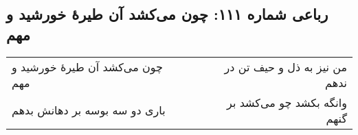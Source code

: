 \begin{center}
\section*{رباعی شماره ۱۱۱: چون می‌کشد آن طیرهٔ خورشید و مهم}
\label{sec:111}
\begin{longtable}{l p{0.5cm} r}
چون می‌کشد آن طیرهٔ خورشید و مهم
&&
من نیز به ذل و حیف تن در ندهم
\\
باری دو سه بوسه بر دهانش بدهم
&&
وانگه بکشد چو می‌کشد بر گنهم
\\
\end{longtable}
\end{center}
